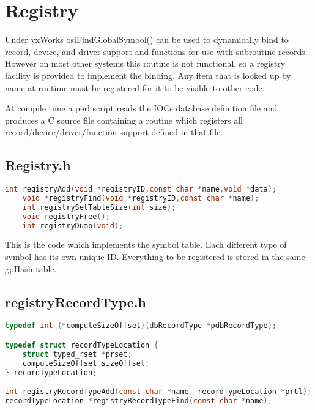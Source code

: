 \chapter{Registry}
\label{Registry}

Under vxWorks osiFindGlobalSymbol() can be used to dynamically bind to record, device, and driver support and 
functions for use with subroutine records. However on most other systems this routine is not functional, so a registry 
facility is provided to implement the binding. Any item that is looked up by name at runtime must be registered for it to be 
visible to other code.

At compile time a perl script reads the IOCs database definition file and produces a C source file containing a routine 
which registers all record/device/driver/function support defined in that file.

\section{Registry.h}

\begin{lstlisting}[language=C]
int registryAdd(void *registryID,const char *name,void *data);
    void *registryFind(void *registryID,const char *name);
    int registrySetTableSize(int size);
    void registryFree();
    int registryDump(void);
\end{lstlisting}

This is the code which implements the symbol table. Each different type of symbol has its own unique ID. Everything to 
be registered is stored in the same gpHash table.

\section{registryRecordType.h}

\begin{lstlisting}[language=C]
typedef int (*computeSizeOffset)(dbRecordType *pdbRecordType);

typedef struct recordTypeLocation {
    struct typed_rset *prset;
    computeSizeOffset sizeOffset;
} recordTypeLocation;

int registryRecordTypeAdd(const char *name, recordTypeLocation *prtl);
recordTypeLocation *registryRecordTypeFind(const char *name);
\end{lstlisting}

